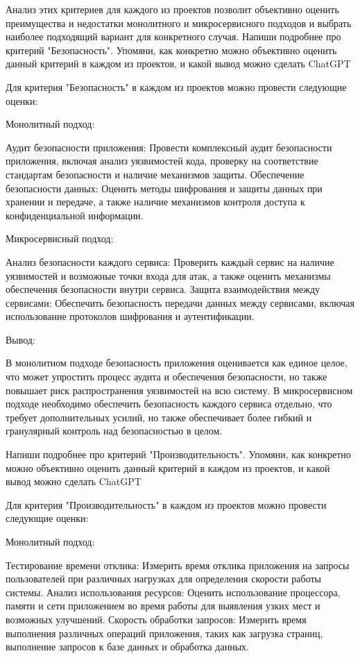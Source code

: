 Анализ этих критериев для каждого из проектов позволит объективно оценить преимущества и недостатки монолитного и микросервисного подходов и выбрать наиболее подходящий вариант для конкретного случая.
Напиши подробнее про критерий "Безопасность". Упомяни, как конкретно можно объективно оценить данный критерий в каждом из проектов, и какой вывод можно сделать
ChatGPT

Для критерия "Безопасность" в каждом из проектов можно провести следующие оценки:

Монолитный подход:

    Аудит безопасности приложения: Провести комплексный аудит безопасности приложения, включая анализ уязвимостей кода, проверку на соответствие стандартам безопасности и наличие механизмов защиты.
    Обеспечение безопасности данных: Оценить методы шифрования и защиты данных при хранении и передаче, а также наличие механизмов контроля доступа к конфиденциальной информации.

Микросервисный подход:

    Анализ безопасности каждого сервиса: Проверить каждый сервис на наличие уязвимостей и возможные точки входа для атак, а также оценить механизмы обеспечения безопасности внутри сервиса.
    Защита взаимодействия между сервисами: Обеспечить безопасность передачи данных между сервисами, включая использование протоколов шифрования и аутентификации.

Вывод:

    В монолитном подходе безопасность приложения оценивается как единое целое, что может упростить процесс аудита и обеспечения безопасности, но также повышает риск распространения уязвимостей на всю систему.
    В микросервисном подходе необходимо обеспечить безопасность каждого сервиса отдельно, что требует дополнительных усилий, но также обеспечивает более гибкий и гранулярный контроль над безопасностью в целом.

Напиши подробнее про критерий "Производительность". Упомяни, как конкретно можно объективно оценить данный критерий в каждом из проектов, и какой вывод можно сделать
ChatGPT

Для критерия "Производительность" в каждом из проектов можно провести следующие оценки:

Монолитный подход:

    Тестирование времени отклика: Измерить время отклика приложения на запросы пользователей при различных нагрузках для определения скорости работы системы.
    Анализ использования ресурсов: Оценить использование процессора, памяти и сети приложением во время работы для выявления узких мест и возможных улучшений.
    Скорость обработки запросов: Измерить время выполнения различных операций приложения, таких как загрузка страниц, выполнение запросов к базе данных и обработка данных.

